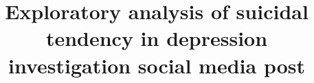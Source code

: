 \documentclass[sn-mathphys,Numbered]{sn-jnl}%
\theoremstyle{thmstyleone}%
\theoremstyle{thmstyletwo}%
\theoremstyle{thmstylethree}%
\begin{document}
\title[Article Title]{Exploratory analysis of suicidal tendency in depression investigation social media post}
\end{document}

